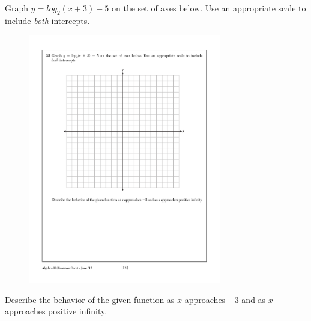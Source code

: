 \newpage %
\item  %
Graph $y=log_2{(x +3)} - 5$ on the set of axes below. Use an appropriate scale to include \textit{both} intercepts.
\vspace{0.5 in}
\begin{figure}[!ht]
    \centering
    \includegraphics[width=0.75\textwidth]{regents-grid.pdf}
\end{figure}

Describe the behavior of the given function as $x$ approaches $-3$ and as $x$ approaches positive infinity.

